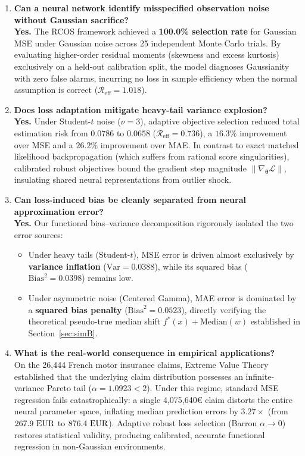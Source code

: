\begin{enumerate}
  \item \textbf{Can a neural network identify misspecified observation noise without Gaussian sacrifice?} \\
  \textbf{Yes.} The RCOS framework achieved a \textbf{100.0\% selection rate} for Gaussian MSE under Gaussian noise across 25 independent Monte Carlo trials. By evaluating higher-order residual moments (skewness and excess kurtosis) exclusively on a held-out calibration split, the model diagnoses Gaussianity with zero false alarms, incurring no loss in sample efficiency when the normal assumption is correct ($\mathcal{R}_{\text{eff}} = 1.018$).

  \item \textbf{Does loss adaptation mitigate heavy-tail variance explosion?} \\
  \textbf{Yes.} Under Student-$t$ noise ($\nu=3$), adaptive objective selection reduced total estimation risk from $0.0786$ to \textbf{$0.0658$} ($\mathcal{R}_{\text{eff}} = 0.736$), a $16.3\%$ improvement over MSE and a $26.2\%$ improvement over MAE. In contrast to exact matched likelihood backpropagation (which suffers from rational score singularities), calibrated robust objectives bound the gradient step magnitude $\|\nabla_{\boldsymbol{\theta}}\mathcal{L}\|$, insulating shared neural representations from outlier shock.

  \item \textbf{Can loss-induced bias be cleanly separated from neural approximation error?} \\
  \textbf{Yes.} Our functional bias--variance decomposition rigorously isolated the two error sources:
  \begin{itemize}
    \item Under heavy tails (Student-$t$), MSE error is driven almost exclusively by \textbf{variance inflation} ($\text{Var} = 0.0388$), while its squared bias ($\text{Bias}^2 = 0.0398$) remains low.
    \item Under asymmetric noise (Centered Gamma), MAE error is dominated by a \textbf{squared bias penalty} ($\text{Bias}^2 = 0.0523$), directly verifying the theoretical pseudo-true median shift $f^*(x) + \text{Median}(w)$ established in Section~\ref{sec:simB}.
  \end{itemize}

  \item \textbf{What is the real-world consequence in empirical applications?} \\
  On the 26,444 French motor insurance claims, Extreme Value Theory established that the underlying claim distribution possesses an infinite-variance Pareto tail ($\alpha = 1.0923 < 2$). Under this regime, standard MSE regression fails catastrophically: a single 4,075,640\euro{} claim distorts the entire neural parameter space, inflating median prediction errors by \textbf{$3.27\times$} (from $267.9\text{ \text{EUR}}$ to $876.4\text{ \text{EUR}}$). Adaptive robust loss selection (Barron $\alpha \to 0$) restores statistical validity, producing calibrated, accurate functional regression in non-Gaussian environments.
\end{enumerate}

